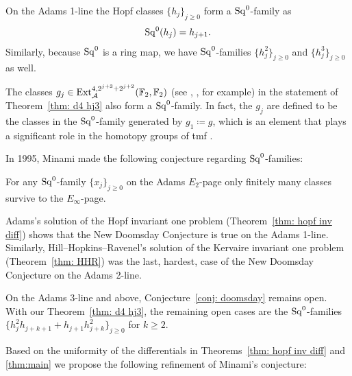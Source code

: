 \begin{exm}
On the Adams 1-line the Hopf classes $\{h_j\}_{j \geq 0}$ form a $\operatorname{\mathrm{Sq}}^0$-family as 
$$\operatorname{\mathrm{Sq}}^0 (h_j) = h_{j+1}.$$
Similarly, because $\operatorname{\mathrm{Sq}}^0$ is a ring map, we have $\operatorname{\mathrm{Sq}}^0$-families $\{h_j^2\}_{j\geq0}$ and $\{h_j^3\}_{j \geq 0}$ as well. 
\end{exm}

\begin{exm}
The classes 
$g_j \in \operatorname{\mathrm{Ext}}^{4, 2^{j+3}+2^{j+2}}_{\operatorname{\mathcal{A}}}(\mathbb{F}_2, \mathbb{F}_2)$ (see \cite{BMMS}, \cite{LinExt}, \cite{Ext5} for example)
in the statement of Theorem~\ref{thm: d4 hj3} also form a $\operatorname{\mathrm{Sq}}^0$-family. In fact, the $g_j$ are defined to be the classes in the $\operatorname{\mathrm{Sq}}^0$-family generated by $g_1 \coloneqq g$, which is an element that plays a significant role in the homotopy groups of tmf \cite{TMFbook}. 
\end{exm}

In 1995, Minami \cite{Minami} made the following conjecture regarding $\operatorname{\mathrm{Sq}}^0$-families:

\begin{cnj}\label{conj: doomsday}
  For any $\operatorname{\mathrm{Sq}}^0$-family $\{x_j\}_{j \geq 0}$ on the Adams $E_2$-page
  only finitely many classes survive to the $E_\infty$-page.
\end{cnj}

Adams's solution of the Hopf invariant one problem (Theorem~\ref{thm: hopf inv diff}) shows that the New Doomsday Conjecture is true on the Adams 1-line. Similarly, Hill--Hopkins--Ravenel's solution of the Kervaire invariant one problem (Theorem~\ref{thm: HHR}) was the last, hardest, case of the New Doomsday Conjecture on the Adams 2-line. 

\begin{rmk}
On the Adams 3-line and above, Conjecture~\ref{conj: doomsday} remains open. With our Theorem~\ref{thm: d4 hj3}, the remaining open cases are the $\operatorname{\mathrm{Sq}}^0$-families $\{ h_j^2 h_{j+k+1} + h_{j+1} h_{j+k}^2 \}_{j \geq 0}$ for $k \geq 2$.
\end{rmk}

Based on the uniformity of the differentials in Theorems~\ref{thm: hopf inv diff} and \ref{thm:main} we propose the following refinement of Minami's conjecture:

